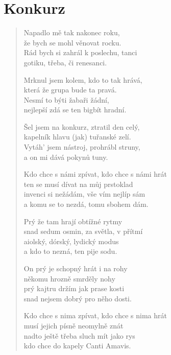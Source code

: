 \section{Konkurz}

\thispagestyle{empty}

\begin{multicols}{2}


\begin{verse}

Napadlo mě tak nakonec roku,\\
že bych se mohl věnovat rocku.\\
Rád bych si zahrál k poslechu, tanci\\
gotiku, třeba, či renesanci.

Mrknul jsem kolem, kdo to tak hrává,\\
která že grupa bude ta pravá.\\
Nesmí to býti žabaři žádní,\\
nejlepší zdá se ten bigbít hradní.

Šel jsem na konkurz, ztratil den celý,\\
kapelník hlavu (jak) tuřanské zelí.\\
Vytáh’ jsem nástroj, prohrábl struny,\\
a on mi dává pokynů tuny.

Kdo chce s námi zpívat, kdo chce s námi hrát\\
ten se musí dívat na můj prstoklad\\
invenci si nežádám, vše vím nejlíp sám\\
a komu se to nezdá, tomu sbohem dám.

Prý že tam hrají obtížné rytmy\\
snad sedum osmin, za světla, v přítmí\\
aiolský, dórský, lydický modus\\
a kdo to nezná, ten pije sodu.

On prý je schopný hrát i na rohy\\
někomu hrozně smrděly nohy\\
prý kajtru držím jak prase kosti\\
snad nejsem dobrý pro něho dosti.

Kdo chce s nima zpívat, kdo chce s nima hrát\\
musí jejich písně neomylně znát\\
nadto ještě třeba sluch mít jako rys\\
kdo chce do kapely Canti Amavis.


\end{verse}
\end{multicols}
